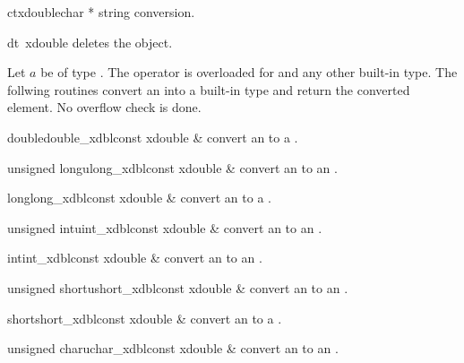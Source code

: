 \begin{fcode}{ct}{xdouble}{char *}
  string conversion.
\end{fcode}

\begin{fcode}{dt}{~xdouble}{}
  deletes the  object.
\end{fcode}



\ASGN

Let $a$ be of type .  The operator \code{=} is overloaded for  and
any other built-in type.  The follwing routines convert an  into a built-in type
and return the converted element.  No overflow check is done.

\begin{fcode}{double}{double_xdbl}{const xdouble &}
  convert an  to a .
\end{fcode}

\begin{fcode}{unsigned long}{ulong_xdbl}{const xdouble &}
  convert an  to an .
\end{fcode}

\begin{fcode}{long}{long_xdbl}{const xdouble &}
  convert an  to a .
\end{fcode}

\begin{fcode}{unsigned int}{uint_xdbl}{const xdouble &}
  convert an  to an .
\end{fcode}

\begin{fcode}{int}{int_xdbl}{const xdouble &}
  convert an  to an .
\end{fcode}

\begin{fcode}{unsigned short}{ushort_xdbl}{const xdouble &}
  convert an  to an .
\end{fcode}

\begin{fcode}{short}{short_xdbl}{const xdouble &}
  convert an  to a .
\end{fcode}

\begin{fcode}{unsigned char}{uchar_xdbl}{const xdouble &}
  convert an  to an .
\end{fcode}

